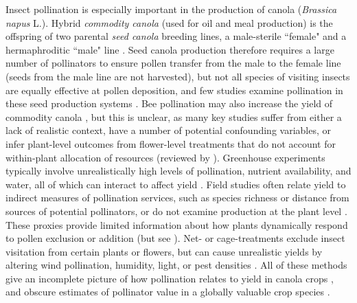 \documentclass[12pt]{article} %
\begin{document}
Insect pollination is especially important in the production of canola (\textit{Brassica napus} L.).
Hybrid \emph{commodity canola} (used for oil and meal production) is the offspring of two parental \emph{seed canola} breeding lines, a male-sterile ``female" and a hermaphroditic ``male" line \citep{westcott2001,steffan2003,clay2009}. 
Seed canola production therefore requires a large number of pollinators to ensure pollen transfer from the male to the female line (seeds from the male line are not harvested), but not all species of visiting insects are equally effective at pollen deposition, and few studies examine pollination in these seed production systems \citep{mesquida1981, mesquida1991, waytes2022}.
Bee pollination may also increase the yield of commodity canola \citep{morandin2005, rader_phd, bommarco2012, bartomeus2015,perrot2018}, but this is unclear, as many key studies suffer from either a lack of realistic context, have a number of potential confounding variables, or infer plant-level outcomes from flower-level treatments that do not account for within-plant allocation of resources (reviewed by \citealt{ouvrard2019}).
Greenhouse experiments typically involve unrealistically high levels of pollination, nutrient availability, and water, all of which can interact to affect yield \citep{bartomeus2015,marini2015}.
Field studies often relate yield to indirect measures of pollination services, such as species richness or distance from sources of potential pollinators, or do not examine production at the plant level \citep{morandin2005, Ricketts2008}.
These proxies provide limited information about how plants dynamically respond to pollen exclusion or addition (but see \citealp{sabbahi2005}).
Net- or cage-treatments exclude insect visitation from certain plants or flowers, but can cause unrealistic yields by altering wind pollination, humidity, light, or pest densities \citep{olsson1960, neal2004, jauker2008}.
All of these methods give an incomplete picture of how pollination relates to yield in canola crops \citep{ouvrard2019}, and obscure estimates of pollinator value in a globally valuable crop species \citep{melathopoulos2015}.
\end{document}
